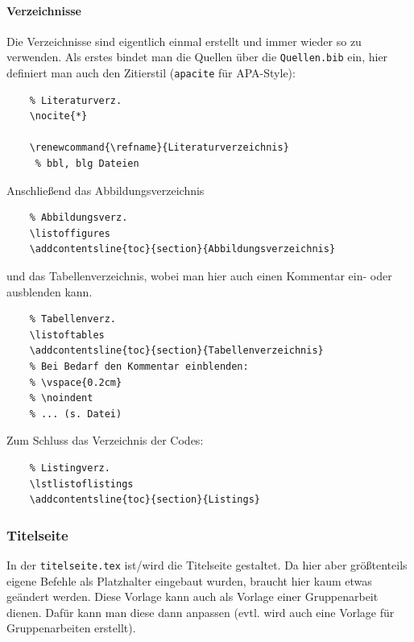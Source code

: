 \paragraph{Verzeichnisse}

Die Verzeichnisse sind eigentlich einmal erstellt und immer wieder so zu verwenden. Als erstes bindet man die Quellen über die \verb|Quellen.bib| ein, hier definiert man auch den Zitierstil (\verb|apacite| für APA-Style):

\begin{verbatim}
    % Literaturverz.
    \nocite{*}
    
    \renewcommand{\refname}{Literaturverzeichnis}
     % bbl, blg Dateien
\end{verbatim}

Anschließend das Abbildungsverzeichnis

\begin{verbatim}
    % Abbildungsverz.
    \listoffigures
    \addcontentsline{toc}{section}{Abbildungsverzeichnis}
\end{verbatim}

und das Tabellenverzeichnis, wobei man hier auch einen Kommentar ein- oder ausblenden kann.

\begin{verbatim}
    % Tabellenverz.
    \listoftables
    \addcontentsline{toc}{section}{Tabellenverzeichnis}
    % Bei Bedarf den Kommentar einblenden:
    % \vspace{0.2cm}
    % \noindent
    % ... (s. Datei)
\end{verbatim}

Zum Schluss das Verzeichnis der Codes:

\begin{verbatim}
    % Listingverz.
    \lstlistoflistings
    \addcontentsline{toc}{section}{Listings}
\end{verbatim}


\subsubsection{Titelseite}

In der \verb|titelseite.tex| ist/wird die Titelseite gestaltet. Da hier aber größtenteils eigene Befehle als Platzhalter eingebaut wurden, braucht hier kaum etwas geändert werden. Diese Vorlage kann auch als Vorlage einer Gruppenarbeit dienen. Dafür kann man diese dann anpassen (evtl. wird auch eine Vorlage für Gruppenarbeiten erstellt).\\

